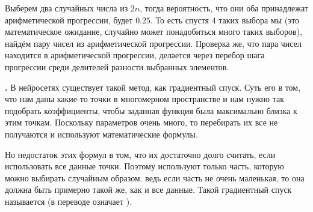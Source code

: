 Выберем два случайных числа из $2n$, тогда вероятность, что они оба принадлежат арифметической прогрессии, будет $0.25$. То есть спустя $4$ таких выбора мы (это математическое ожидание, случайно может понадобиться много таких выборов), найдём пару чисел из арифметической прогрессии. Проверка же, что пара чисел находится в арифметической прогрессии, делается через перебор шага прогрессии среди делителей разности выбранных элементов. 

\textbf{.} В нейросетях существует такой метод, как градиентный спуск. Суть его в том, что нам даны какие-то точки в многомерном пространстве и нам нужно так подобрать коэффициенты, чтобы заданная функция была максимально близка к этим точкам. Поскольку параметров очень много, то перебирать их все не получаются и используют математические формулы.

Но недостаток этих формул в том, что их достаточно долго считать, если использовать все данные точки. Поэтому используют только часть, которую можно выбирать случайным образом. ведь если часть не очень маленькая, то она должна быть примерно такой же, как и все данные. Такой градиентный спуск называется  (в переводе означает ).
